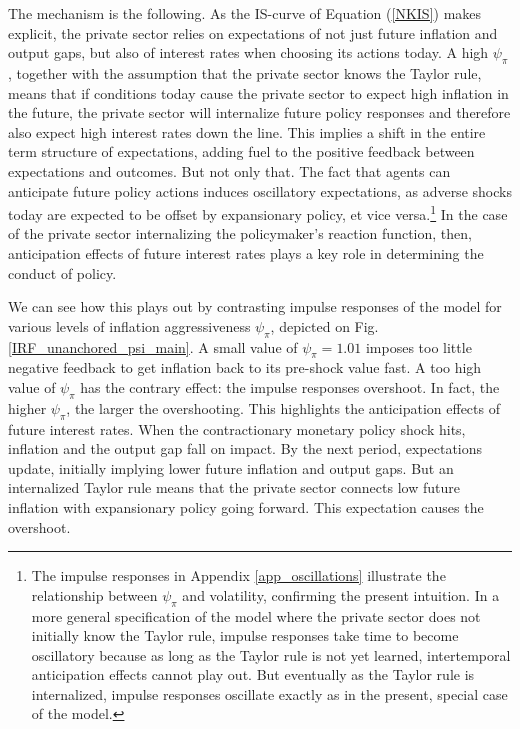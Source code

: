 \documentclass[11pt]{article}
\renewcommand{\[}{\begin{equation}}
\renewcommand{\]}{\end{equation}}
\begin{document}
The mechanism is the following. As the IS-curve of Equation (\ref{NKIS}) makes explicit, the private sector relies on expectations of not just future inflation and output gaps, but also of interest rates when choosing its actions today. A high $\psi_{\pi}$, together with the assumption that the private sector knows the Taylor rule, means that if conditions today cause the private sector to expect high inflation in the future, the private sector will internalize future policy responses and therefore also expect high interest rates down the line. This implies a shift in the entire term structure of expectations, adding fuel to the positive feedback between expectations and outcomes. But not only that. The fact that agents can anticipate future policy actions induces oscillatory expectations, as adverse shocks today are expected to be offset by expansionary policy, et vice versa.\footnote{The impulse responses in Appendix \ref{app_oscillations} illustrate the relationship between $\psi_{\pi}$ and volatility, confirming the present intuition. In a more general specification of the model where the private sector does not initially know the Taylor rule, impulse responses take time to become oscillatory because as long as the Taylor rule is not yet learned, intertemporal anticipation effects cannot play out. But eventually as the Taylor rule is internalized, impulse responses oscillate exactly as in the present, special case of the model.} In the case of the private sector internalizing the policymaker's reaction function, then, anticipation effects of future interest rates plays a key role in determining the conduct of policy.

We can see how this plays out by contrasting impulse responses of the model for various levels of inflation aggressiveness $\psi_{\pi}$, depicted on Fig. \ref{IRF_unanchored_psi_main}. A small value of $\psi_{\pi} = 1.01$ imposes too little negative feedback to get inflation back to its pre-shock value fast. A too high value of $\psi_{\pi}$ has the contrary effect: the impulse responses overshoot. In fact, the higher $\psi_{\pi}$, the larger the overshooting. This highlights the anticipation effects of future interest rates. When the contractionary monetary policy shock hits, inflation and the output gap fall on impact. By the next period, expectations update, initially implying lower future inflation and output gaps. But an internalized Taylor rule means that the private sector connects low future inflation with expansionary policy going forward. This expectation causes the overshoot.
\end{document}
